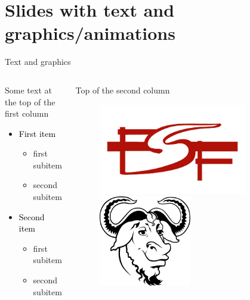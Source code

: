 \documentclass[11pt,t]{beamer}
\begin{document}
\section{Slides with text and graphics/animations}
\begin{frame}[t]{Text and graphics}
	\begin{columns}
		\begin{column}{0.8\textwidth}
			Some text at the top of the first column
			\vspace{5mm}
			\begin{itemize}
				\item \textcolor{black}{First item}
					\begin{itemize}
						\item first subitem
						\item second subitem
					\end{itemize}
				\item \textcolor{black}{Second item}
					\begin{itemize}
						\item first subitem
						\item second subitem
					\end{itemize}
			\end{itemize}
		\end{column}
		\begin{column}{.2\textwidth}
			Top of the second column
			\begin{figure}
				\includegraphics[width=0.8\textwidth]{FSF_Logo_menor}\\
				\vspace{4mm}
				\includegraphics[width=0.5\textwidth]{heckert_gnu}\\

\end{figure}
\end{column}
\end{columns}
\end{frame}
\end{document}
